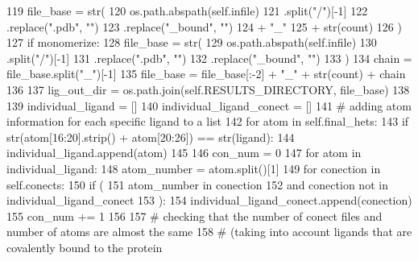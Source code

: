 \begin{DoxyCode}
119                 file\_base = str(
120                                 os.path.abspath(self.infile)
121                                 .split(\textcolor{stringliteral}{"/"})[-1]
122                                 .replace(\textcolor{stringliteral}{".pdb"}, \textcolor{stringliteral}{""})
123                                 .replace(\textcolor{stringliteral}{"\_bound"}, \textcolor{stringliteral}{""})
124                                 + \textcolor{stringliteral}{"\_"}
125                                 + str(count)
126                             )
127             \textcolor{keywordflow}{if} monomerize:
128                 file\_base = str(
129                                 os.path.abspath(self.infile)
130                                 .split(\textcolor{stringliteral}{"/"})[-1]
131                                 .replace(\textcolor{stringliteral}{".pdb"}, \textcolor{stringliteral}{""})
132                                 .replace(\textcolor{stringliteral}{"\_bound"}, \textcolor{stringliteral}{""})
133                             )
134                 chain = file\_base.split(\textcolor{stringliteral}{"\_"})[-1]
135                 file\_base = file\_base[:-2] + \textcolor{stringliteral}{"\_"} + str(count) + chain
136 
137         lig\_out\_dir = os.path.join(self.RESULTS\_DIRECTORY, file\_base)
138 
139         individual\_ligand = []
140         individual\_ligand\_conect = []
141         \textcolor{comment}{# adding atom information for each specific ligand to a list}
142         \textcolor{keywordflow}{for} atom \textcolor{keywordflow}{in} self.final\_hets:
143             \textcolor{keywordflow}{if} str(atom[16:20].strip() + atom[20:26]) == str(ligand):
144                 individual\_ligand.append(atom)
145 
146         con\_num = 0
147         \textcolor{keywordflow}{for} atom \textcolor{keywordflow}{in} individual\_ligand:
148             atom\_number = atom.split()[1]
149             \textcolor{keywordflow}{for} conection \textcolor{keywordflow}{in} self.conects:
150                 \textcolor{keywordflow}{if} (
151                     atom\_number \textcolor{keywordflow}{in} conection
152                     \textcolor{keywordflow}{and} conection \textcolor{keywordflow}{not} \textcolor{keywordflow}{in} individual\_ligand\_conect
153                 ):
154                     individual\_ligand\_conect.append(conection)
155                     con\_num += 1
156 
157         \textcolor{comment}{# checking that the number of conect files and number of atoms are almost the same}
158         \textcolor{comment}{# (taking into account ligands that are covalently bound to the protein}

\end{DoxyCode}
